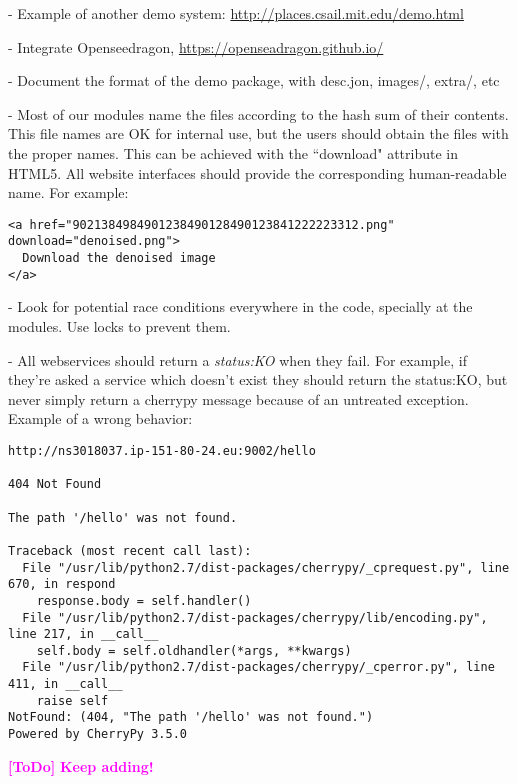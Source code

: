 \documentclass[a4paper,12pt]{article}
\newcommand{\ToDo}[1]{\textcolor{magenta}{\textbf{[ToDo]} \textbf{#1}}}
\begin{document}
- Example of another demo system: \url{http://places.csail.mit.edu/demo.html}

- Integrate Openseedragon, \url{https://openseadragon.github.io/}

- Document the format of the demo package, with desc.jon, images/, extra/, etc

- Most of our modules name the files according to the hash sum of their contents. This file names are OK for internal use, but the users should obtain the files with the proper names. This can be achieved with the ``download" attribute in HTML5. All website interfaces should provide the corresponding human-readable name. For example:

\begin{verbatim}
<a href="9021384984901238490128490123841222223312.png" download="denoised.png">
  Download the denoised image
</a>
\end{verbatim}

- Look for potential race conditions everywhere in the code, specially at the modules. Use locks to prevent them.

- All webservices should return a \emph{status:KO} when they fail. For example, if they're asked a service which doesn't exist they should return the status:KO, but never simply return a cherrypy message because of an untreated exception. Example of a wrong behavior:

\begin{verbatim}
http://ns3018037.ip-151-80-24.eu:9002/hello

404 Not Found

The path '/hello' was not found.

Traceback (most recent call last):
  File "/usr/lib/python2.7/dist-packages/cherrypy/_cprequest.py", line 670, in respond
    response.body = self.handler()
  File "/usr/lib/python2.7/dist-packages/cherrypy/lib/encoding.py", line 217, in __call__
    self.body = self.oldhandler(*args, **kwargs)
  File "/usr/lib/python2.7/dist-packages/cherrypy/_cperror.py", line 411, in __call__
    raise self
NotFound: (404, "The path '/hello' was not found.")
Powered by CherryPy 3.5.0
\end{verbatim}

\ToDo{Keep adding!}




\end{document}

